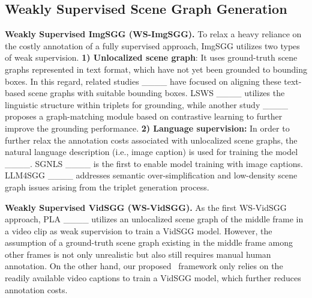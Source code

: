 \vspace{-1.5ex}
\subsection{Weakly Supervised Scene Graph Generation}
\vspace{-0.5ex}
\noindent\textbf{Weakly Supervised ImgSGG (WS-ImgSGG). }
To relax a heavy reliance on the costly annotation of a fully supervised approach, ImgSGG utilizes two types of weak supervision. \textbf{1) Unlocalized scene graph}: It uses ground-truth scene graphs represented in text format, which have not yet been grounded to bounding boxes. In this regard, related studies ____ have focused on aligning these text-based scene graphs with suitable bounding boxes. LSWS ____ utilizes the linguistic structure within triplets for grounding, while another study ____ proposes a graph-matching module based on contrastive learning to further improve the grounding performance. \textbf{2) Language supervision:} In order to further relax the annotation costs associated with unlocalized scene graphs, the natural language description (i.e., image caption) is used for training the model ____. SGNLS ____ is the first to enable model training with image captions. LLM4SGG ____ addresses semantic over-simplification and low-density scene graph issues arising from the triplet generation process. 

\smallskip
\noindent\textbf{Weakly Supervised VidSGG (WS-VidSGG). }
As the first WS-VidSGG approach, PLA ____ utilizes an unlocalized scene graph of the middle frame in a video clip as weak supervision to train a VidSGG model. 
However, the assumption of a ground-truth scene graph existing in the middle frame among other frames is not only unrealistic but also still requires manual human annotation. On the other hand, our proposed~\proposed{} framework only relies on the readily available video captions to train a VidSGG model, which further reduces annotation costs.




\vspace{-2ex}